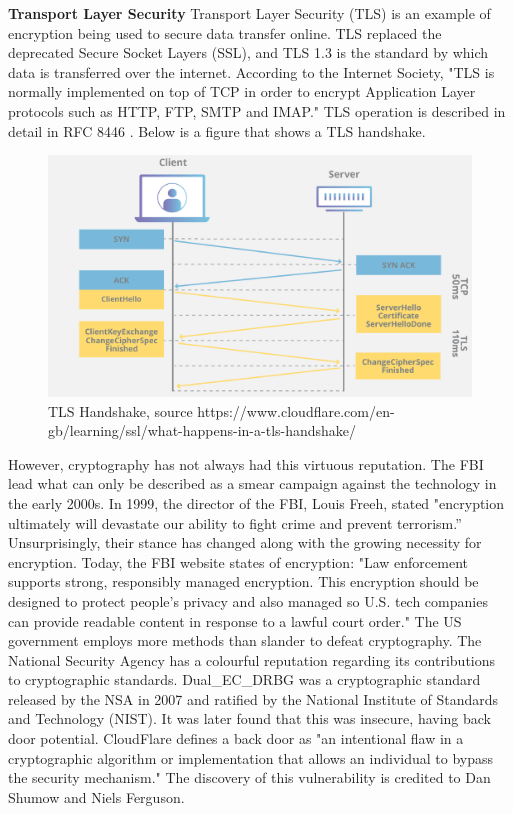 \textbf{Transport Layer Security}
Transport Layer Security (TLS) is an example of encryption being used to secure data transfer online. TLS replaced the deprecated Secure Socket Layers (SSL), and TLS 1.3 is the standard by which data is transferred over the internet. According to the Internet Society, "TLS is normally implemented on top of TCP in order to encrypt Application Layer protocols such as HTTP, FTP, SMTP and IMAP." \cite{internetsociety_tls_basics} TLS operation is described in detail in RFC 8446 \cite{rfc8446} \cite{cloudflare_tls_handshake}. Below is a figure that shows a TLS handshake.

\begin{figure}
  \centering
  \includegraphics[width=\textwidth]{Circumvention Tools/TLS_Handshake.png}
  \caption{TLS Handshake, source https://www.cloudflare.com/en-gb/learning/ssl/what-happens-in-a-tls-handshake/}
  \label{fig:your_label_here}
\end{figure}

However, cryptography has not always had this virtuous reputation. The FBI lead what can only be described as a smear campaign against the technology in the early 2000s. In 1999, the director of the FBI, Louis Freeh, stated "encryption ultimately will devastate our ability to fight crime and prevent terrorism.” \cite{bitsbook_chapter5} Unsurprisingly, their stance has changed along with the growing necessity for encryption. Today, the FBI website states of encryption: "Law enforcement supports strong, responsibly managed encryption. This encryption should be designed to protect people’s privacy and also managed so U.S. tech companies can provide readable content in response to a lawful court order." \cite{fbi_lawful_access} The US government employs more methods than slander to defeat cryptography. The National Security Agency \cite{nsa_website} has a colourful reputation regarding its contributions to cryptographic standards. Dual\_EC\_DRBG was a cryptographic standard released by the NSA in 2007 and ratified by the National Institute of Standards and Technology (NIST). It was later found that this was insecure, having back door potential. CloudFlare defines a back door as "an intentional flaw in a cryptographic algorithm or implementation that allows an individual to bypass the security mechanism." \cite{cloudflare_nsa_backdoor} The discovery of this vulnerability is credited to Dan Shumow and Niels Ferguson. \cite{schneier_nsa_backdoor}

